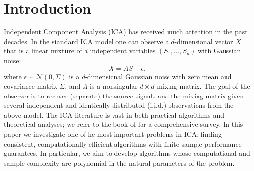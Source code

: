 \documentclass{article}
\newcommand{\iid}{i.i.d.\xspace}
\theoremstyle{definition}
\begin{document}
\section{Introduction}
\label{sec:Intro}
Independent Component Analysis (ICA)
has received much attention in the past decades. 
In the standard ICA model one can observe a $d$-dimensional vector $X$ that is a linear mixture of $d$ independent variables $(S_1,\ldots, S_d)$ with Gaussian noise:
\begin{equation}
\label{eq:stoch-ICA}
X = AS+\epsilon,
\end{equation}
where $\epsilon \sim \mathcal{N}(0,\Sigma)$ is a $d$-dimensional Gaussian noise with zero mean and covariance matrix $\Sigma$, and $A$ is a nonsingular $d \times d$ mixing matrix. The goal of the observer is to recover (separate) the source signals and the mixing matrix given several independent and identically distributed (\iid) observations from the above model.
The ICA literature is vast in both practical algorithms and theoretical analyses; 
we refer to the book of \citet{comon2010handbook} for a comprehensive survey.
In this paper we investigate one of he most important problems in ICA: finding consistent, computationally efficient algorithms with finite-sample performance guarantees. In particular, we aim to develop algorithms whose computational and sample complexity are polynomial in the natural parameters of the problem.
\end{document}

